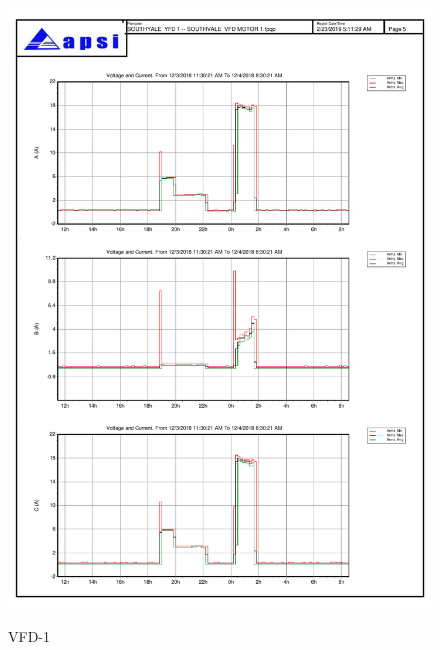 \begin{figure}[]
	\includegraphics[width=\textwidth]{figures/fig_ch04_elecaudit_load_flow_vfd1.pdf} \\
	\caption{VFD-1 }
	\label{fig_ch04_elecaudit_load_flow_vfd1} 
\end{figure}



